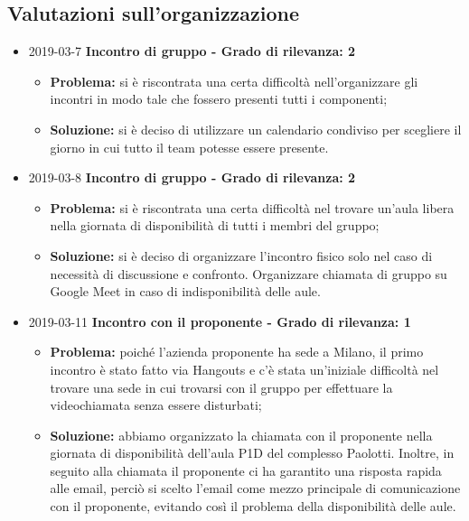 \subsection{Valutazioni sull'organizzazione}
\begin{itemize}	
		
		\item 2019-03-7 \textbf{Incontro di gruppo - Grado di rilevanza: 2} \\
		\begin{itemize}
			\item \textbf{Problema:} si è riscontrata una certa difficoltà 				nell'organizzare gli incontri in modo
		tale che fossero presenti tutti i componenti;
			\item \textbf{Soluzione:} si è deciso di utilizzare un calendario condiviso per scegliere il giorno
		in cui tutto il team potesse essere presente. 
		\end{itemize}
		
		\item 2019-03-8 \textbf{Incontro di gruppo - Grado di rilevanza: 2} \\
		\begin{itemize}
			\item \textbf{Problema:} si è riscontrata una certa difficoltà nel trovare un'aula libera nella giornata di disponibilità di tutti i membri del gruppo;
			\item \textbf{Soluzione:} si è deciso di organizzare l'incontro fisico solo nel caso di necessità di discussione e confronto. Organizzare chiamata di gruppo su Google Meet in caso di indisponibilità delle aule. 
		\end{itemize}
						
						
		\item 2019-03-11 \textbf{Incontro con il proponente - Grado di rilevanza: 1} \\
		\begin{itemize}
			\item \textbf{Problema:} poiché l'azienda proponente ha sede a Milano, il primo incontro è stato fatto
		via Hangouts e c'è stata un'iniziale difficoltà nel trovare una sede in cui 
		trovarsi con il gruppo per effettuare la videochiamata senza essere disturbati;
			\item \textbf{Soluzione:} abbiamo organizzato la chiamata con il proponente nella giornata di disponibilità dell'aula P1D del complesso Paolotti. Inoltre, in seguito alla chiamata il proponente ci ha garantito una risposta rapida alle email, perciò si scelto l'email come mezzo principale di comunicazione con il proponente, evitando così il problema della disponibilità delle aule.
		\end{itemize}
		

\end{itemize}
